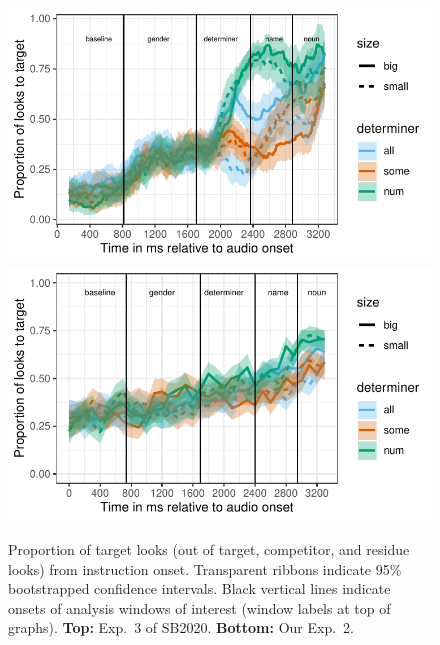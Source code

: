 \documentclass[10pt,letterpaper]{article}
\newcommand{\expref}[1]{Exp.~#1}
\begin{document}
\begin{figure}[tbh!]
\centering
\includegraphics[width=\columnwidth]{../../analysis/SunBreheny/1_incremental/main/graphs/proportions_condsize_withresidue_target}
\includegraphics[width=\columnwidth]{../../analysis/SunBreheny/2_webgazer/main/graphs/proportions_condsize_withresidue_target}
\caption{Proportion of target looks (out of target, competitor, and residue looks) from instruction onset. Transparent ribbons indicate 95\% bootstrapped confidence intervals. Black vertical lines indicate onsets of analysis windows of interest (window labels at top of graphs). \textbf{Top:} \expref{3} of SB2020. \textbf{Bottom:} Our \expref{2}.}
\label{fig:results-original}
\end{figure}
\end{document}
